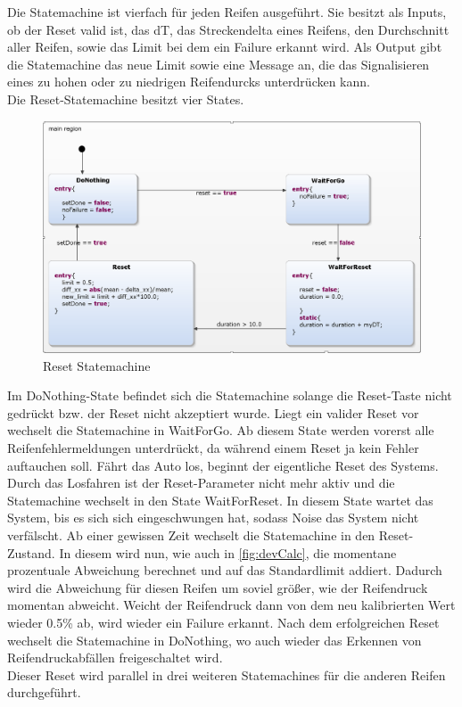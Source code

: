 Die Statemachine ist vierfach für jeden Reifen ausgeführt. Sie besitzt als Inputs, ob der Reset valid ist, das dT, das Streckendelta eines Reifens, den Durchschnitt aller Reifen, sowie das Limit bei dem ein Failure erkannt wird. Als Output gibt die Statemachine das neue Limit sowie eine Message an, die das Signalisieren eines zu hohen oder zu niedrigen Reifendurcks unterdrücken kann.\\
Die Reset-Statemachine besitzt vier States.
\begin{figure}[H]
	\centering
	\includegraphics[width=1\linewidth]{../Graphiken/ResetStateMachine.png}
	\caption{Reset Statemachine}
	\label{fig:ResetStateMachine}
\end{figure}
Im DoNothing-State befindet sich die Statemachine solange die Reset-Taste nicht gedrückt bzw. der Reset nicht akzeptiert wurde. Liegt ein valider Reset vor wechselt die Statemachine in WaitForGo. Ab diesem State werden vorerst alle Reifenfehlermeldungen unterdrückt, da während einem Reset ja kein Fehler auftauchen soll. Fährt das Auto los, beginnt der eigentliche Reset des Systems. Durch das Losfahren ist der Reset-Parameter nicht mehr aktiv und die Statemachine wechselt in den State WaitForReset. In diesem State wartet das System, bis es sich sich eingeschwungen hat, sodass Noise das System nicht verfälscht. Ab einer gewissen Zeit wechselt die Statemachine in den Reset-Zustand. In diesem wird nun, wie auch in \autoref{fig:devCalc}, die momentane prozentuale Abweichung berechnet und auf das Standardlimit addiert. Dadurch wird die Abweichung für diesen Reifen um soviel größer, wie der Reifendruck momentan abweicht. Weicht der Reifendruck dann von dem neu kalibrierten Wert wieder 0.5\% ab, wird wieder ein Failure erkannt. Nach dem erfolgreichen Reset wechselt die Statemachine in DoNothing, wo auch wieder das Erkennen von Reifendruckabfällen freigeschaltet wird.\\
Dieser Reset wird parallel in drei weiteren Statemachines für die anderen Reifen durchgeführt.\\

